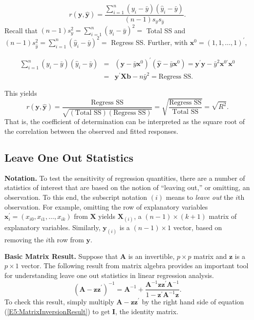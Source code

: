 
\begin{equation*}
r(\mathbf{y,\hat{y}})=\frac{\sum_{i=1}^{n}(y_i-\bar{y})(\hat{y}_i-\bar{y}%
)}{(n-1)s_{y}s_{\hat{y}}}.
\end{equation*}
Recall that $(n-1)s_{y}^2=\sum_{i=1}^{n}(y_i-\bar{y})^2=$ Total SS and $%
(n-1)s_{\hat{y}}^2=\sum_{i=1}^{n}(\hat{y}_i-\bar{y})^2=$ Regress SS.
Further, with $\mathbf{x}^{0}=(1,1,\ldots,1)^{\prime}$,
\begin{center}
\begin{eqnarray*}
\sum_{i=1}^{n}(y_i-\bar{y})(\hat{y}_i-\bar{y}) &=&(\mathbf{y}-\bar{y}%
\mathbf{x}^{0})^{\prime}(\mathbf{\hat{y}}-\bar{y}\mathbf{x}^{0})=\mathbf{y}%
^{\prime}\mathbf{\hat{y}}-\bar{y}^2\mathbf{x}^{0\prime }\mathbf{x}^{0} \\
&=&\mathbf{y}^{\prime}\mathbf{Xb}-n\bar{y}^2=\text{Regress SS.}
\end{eqnarray*}
\end{center}
This yields
\begin{equation}\label{E5:R2Correlation}
r(\mathbf{y,\hat{y}})=\frac{\text{Regress SS}}{\sqrt{\left(
\text{Total SS} \right) \left( \text{Regress SS}\right)
}}=\sqrt{\frac{\text{Regress SS}}{\text{Total SS}}}=\sqrt{R^2}.
\end{equation}
That is, the coefficient of determination can be interpreted as the
square root of the correlation between the observed and fitted
responses.

\subsection{Leave One Out Statistics}\label{S5:LOOStatistics}

\textbf{Notation.} To test the sensitivity of regression quantities,
there are a number of statistics of interest that are based on the
notion of ``leaving out,'' or omitting, an observation. To this end,
the subscript notation $(i)$ means to \textit{leave out} the $i$th
observation. For example, omitting the row of explanatory variables
$\mathbf{x}_i^{\prime}=(x_{i0},x_{i1},\dots,x_{ik})$ from
$\mathbf{X}$ yields $\mathbf{X}_{(i)}$, a
$(n-1)\times (k+1)$ matrix of explanatory variables. Similarly, $\mathbf{y}%
_{(i)}$ is a $(n-1)\times 1$ vector, based on removing the $i$th row from $%
\mathbf{y}$.

\textbf{Basic Matrix Result.} Suppose that $\mathbf{A}$ is an invertible, $%
p\times p$ matrix and $\mathbf{z}$ is a $p\times 1$ vector. The
following result from matrix algebra provides an important tool for
understanding leave one out statistics in linear regression
analysis.
\begin{equation}\label{E5:MatrixInversionResult}
\left( \mathbf{A-zz}^{\prime}\right) ^{-1}=\mathbf{A}^{-1}+\frac{\mathbf{A}%
^{-1}\mathbf{zz}^{\prime}\mathbf{A}^{-1}}{1-\mathbf{z}^{\prime}\mathbf{A}%
^{-1}\mathbf{z}}.
\end{equation}
To check this result, simply multiply $\mathbf{A-zz}^{\prime}$ by
the right hand side of equation (\ref{E5:MatrixInversionResult}) to
get $\mathbf{I}$, the identity matrix.

